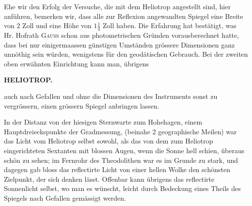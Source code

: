 \par\noindent\hspace*{\parindent}Ehe wir den Erfolg der Versuche, die mit dem Heliotrop angestellt sind, hier anführen, bemerken wir, dass alle zur Reflexion angewandten Spiegel eine Breite von 2 Zoll und eine Höhe von $1\frac14$ Zoll haben. Die Erfahrung hat bestätigt, was Hr. Hofrath \textsc{Gauss} schon aus photometrischen Gründen vorausberechnet hatte, dass bei nur einigermaassen günstigen Umständen grössere Dimensionen ganz unnöthig sein würden, wenigstens für den geodätischen Gebrauch. Bei der zweiten oben erwähnten Einrichtung kann man, übrigens
\par\clearpage
\noindent{}\hfill{\small\textbf{HELIOTROP.}}\hfill\null\par\medskip
\noindent auch nach Gefallen und ohne die Dimensionen des Instruments sonst zu vergrössern, einen grössern Spiegel anbringen lassen.
\begin{center}
\end{center}
\par\noindent\hspace*{\parindent}In der Distanz von der hiesigen Sternwarte zum Hohehagen, einem Hauptdreieckspunkte der Gradmessung, (beinahe 2 geographische Meilen) war das Licht vom Heliotrop selbst sowohl, als das von dem zum Heliotrop eingerichteten Sextanten mit blossen Augen, wenn die Sonne hell schien, überaus schön zu sehen; im Fernrohr des Theodolithen war es im Grunde zu stark, und dagegen gab bloss das reflectirte Licht von einer hellen Wolke den schönsten Zielpunkt, der sich denken lässt. Offenbar kann übrigens das reflectirte Sonnenlicht selbst, wo man es wünscht, leicht durch Bedeckung eines Theils des Spiegels nach Gefallen gemässigt werden.

